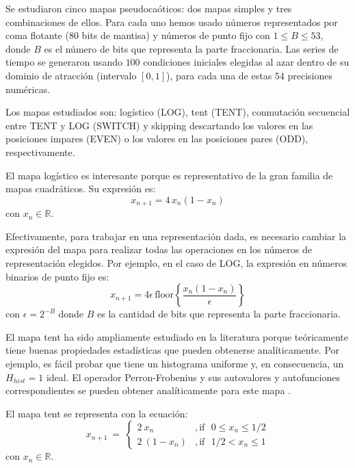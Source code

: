 Se estudiaron cinco mapas pseudocaóticos: dos mapas simples y tres combinaciones de ellos.
Para cada uno hemos usado números representados por coma flotante (80 bits de mantisa) y números de punto fijo con $1\leq B \leq 53$, donde $B$ es el número de bits que representa la parte fraccionaria.
Las series de tiempo se generaron usando $100$ condiciones iniciales elegidas al azar dentro de su dominio de atracción (intervalo $[0,1]$), para cada una de estas $54$ precisiones numéricas.

Los mapas estudiados son: logístico (LOG), tent (TENT), conmutación secuencial entre TENT y LOG (SWITCH) y skipping descartando los valores en las posiciones impares (EVEN) o los valores en las posiciones pares (ODD), respectivamente.

El mapa logístico es interesante porque es representativo de la gran familia de mapas cuadráticos.
Su expresión es:
%
\begin{equation}\label{eq:logimap}
x_{n+1}=4\,x_{n}(1-x_{n}) 
\end{equation}
%
con $x_n \in \mathbb{R}$.

Efectivamente, para trabajar en una representación dada, es necesario cambiar la expresión del mapa para realizar todas las operaciones en los números de representación elegidos.
Por ejemplo, en el caso de LOG, la expresión en números binarios de punto fijo es:
%
\begin{equation}\label{eq:logimapB2}
x_{n+1}=4 \epsilon \,\text{floor}\left\{\frac{x_n(1-x_n)}{\epsilon}\right\}
\end{equation}
%
con $\epsilon = 2^{-B}$ donde $B$ es la cantidad de bits que representa la parte fraccionaria.

El mapa tent ha sido ampliamente estudiado en la literatura porque teóricamente tiene buenas propiedades estadísticas que pueden obtenerse analíticamente.
Por ejemplo, es fácil probar que tiene un histograma uniforme y, en consecuencia, un $H_{hist} = 1$ ideal.
El operador Perron-Frobenius y sus autovalores y autofunciones correspondientes se pueden obtener analíticamente para este mapa \cite{Lasota1994}.

El mapa tent se representa con la ecuación:
%
\begin{equation}\label{eq:tentmap}
x_{n+1}~=~ \left\{ \begin{array}{ll}
2~{x_n} &, \textrm{if ~$0\leq x_n\leq 1/2$}\\
2~(1-{x_n}) &, \textrm{if ~$1/2<x_n\leq 1$} 
\end{array} \right. 
\end{equation}
%
con $x_n \in \mathbb{R}$.

